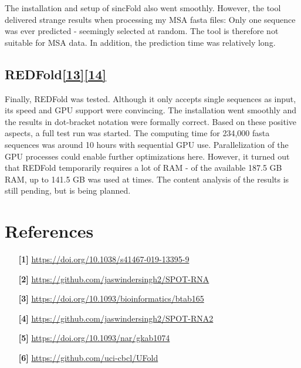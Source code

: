 \documentclass{article}
\begin{document}
\begin{large}
\begin{large}
\begin{large}
The installation and setup of sincFold also went smoothly. However, the tool delivered strange results when processing my MSA fasta files: Only one sequence was ever predicted - seemingly selected at random. The tool is therefore not suitable for MSA data. In addition, the prediction time was relatively long.

\subsection{{REDFold}\href{https://doi.org/10.1186/s12859-023-05238-8}{\textbf{[13]}}\href{https://github.com/aky3100/REDfold}{\textbf{[14]}}}

Finally, REDFold was tested. Although it only accepts single sequences as input, its speed and GPU support were convincing. The installation went smoothly and the results in dot-bracket notation were formally correct. Based on these positive aspects, a full test run was started. The computing time for 234,000 fasta sequences was around 10 hours with sequential GPU use. Parallelization of the GPU processes could enable further optimizations here. However, it turned out that REDFold temporarily requires a lot of RAM - of the available 187.5 GB RAM, up to 141.5 GB was used at times. The content analysis of the results is still pending, but is being planned.

\section{References}
\begin{itemize}
    \item[\textbf{[1]}] \url{https://doi.org/10.1038/s41467-019-13395-9} \par
    \item[\textbf{[2]}] \url{https://github.com/jaswindersingh2/SPOT-RNA} \par
    
    \item[\textbf{[3]}] \url{https://doi.org/10.1093/bioinformatics/btab165} \par
    \item[\textbf{[4]}] \url{https://github.com/jaswindersingh2/SPOT-RNA2} \par
    
    \item[\textbf{[5]}] \url{https://doi.org/10.1093/nar/gkab1074} \par
    \item[\textbf{[6]}] \url{https://github.com/uci-cbcl/UFold} \par
    

\end{itemize}
\end{large}
\end{large}
\end{large}
\end{document}
